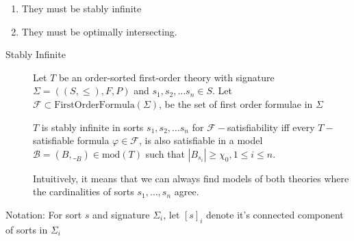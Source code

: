 \documentclass[]{article}
\providecommand{\tightlist}{%
  \setlength{\itemsep}{0pt}\setlength{\parskip}{0pt}}
\renewcommand \phi {\varphi}
\newcommand \FO       {\text{FirstOrderFormula}}
\newcommand \model    {\text{mod}}
\newcommand \F        {\mathcal F}
\begin{document}
\begin{enumerate}
\def\labelenumi{\arabic{enumi}.}
\tightlist
\item
  They must be stably infinite
\item
  They must be optimally intersecting.
\end{enumerate}

\begin{description}
\item[Stably Infinite]
Let \(T\) be an order-sorted first-order theory with signature
\(\Sigma = ((S, \le), F, P)\) and \(s_1, s_2,\ldots s_n \in S\). Let
\(\F \subset \FO(\Sigma)\), be the set of first order formulae in
\(\Sigma\)

\(T\) is stably infinite in sorts \(s_1, s_2,\ldots s_n\) for
\(\F-\)satisfiability iff every \(T-\)satisfiable formula
\(\phi \in \F\), is also satisfiable in a model
\(\mathcal B = (B, \__B) \in \model(T)\) such that
\(|B_{s_i}| \ge \chi_0, 1 \le i \le n\).

Intuitively, it means that we can always find models of both theories
where the cardinalities of sorts \(s_1, \ldots, s_n\) agree.
\end{description}

Notation: For sort \(s\) and signature \(\Sigma_i\), let \([s]_i\)
denote it's connected component of sorts in \(\Sigma_i\)
\end{document}
